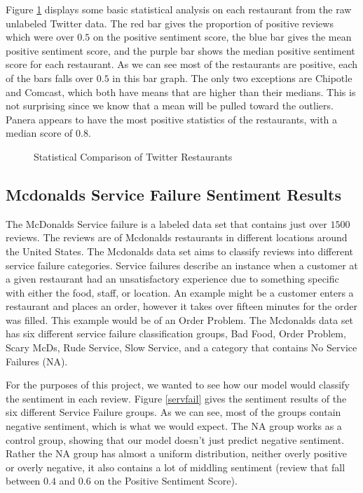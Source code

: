\documentclass[titlepage,letterpaper]{article}
\begin{document}
Figure \ref{compstat} displays some basic statistical analysis on each restaurant from the raw unlabeled Twitter data. The red bar gives the proportion of positive reviews which were over $0.5$ on the positive sentiment score, the blue bar gives the mean positive sentiment score, and the purple bar shows the median positive sentiment score for each restaurant. As we can see most of the restaurants are positive, each of the bars falls over $0.5$ in this bar graph. The only two exceptions are Chipotle and Comcast, which both have means that are higher than their medians. This is not surprising since we know that a mean will be pulled toward the outliers. Panera appears to have the most positive statistics of the restaurants, with a median score of $0.8$. 

\begin{figure}[htb]
	\centering
	\caption{Statistical Comparison of Twitter Restaurants}
	
	\label{compstat}
\end{figure}


\subsection{Mcdonalds Service Failure Sentiment Results}

The McDonalds Service failure is a labeled data set that contains just over $1500$ reviews. The reviews are of Mcdonalds restaurants in different locations around the United States. The Mcdonalds data set aims to classify reviews into different service failure categories. Service failures describe an instance when a customer at a given restaurant had an unsatisfactory experience due to something specific with either the food, staff, or location. An example might be a customer enters a restaurant and places an order, however it takes over fifteen minutes for the order was filled. This example would be of an Order Problem. The Mcdonalds data set has six different service failure classification groups, Bad Food, Order Problem, Scary McDs, Rude Service, Slow Service, and a category that contains No Service Failures (NA). 

For the purposes of this project, we wanted to see how our model would classify the sentiment in each review. Figure \ref{servfail} gives the sentiment results of the six different Service Failure groups. As we can see, most of the groups contain negative sentiment, which is what we would expect. The NA group works as a control group, showing that our model doesn't just predict negative sentiment. Rather the NA group has almost a uniform distribution, neither overly positive or overly negative, it also contains a lot of middling sentiment (review that fall between $0.4$ and $0.6$ on the Positive Sentiment Score).
\end{document}
